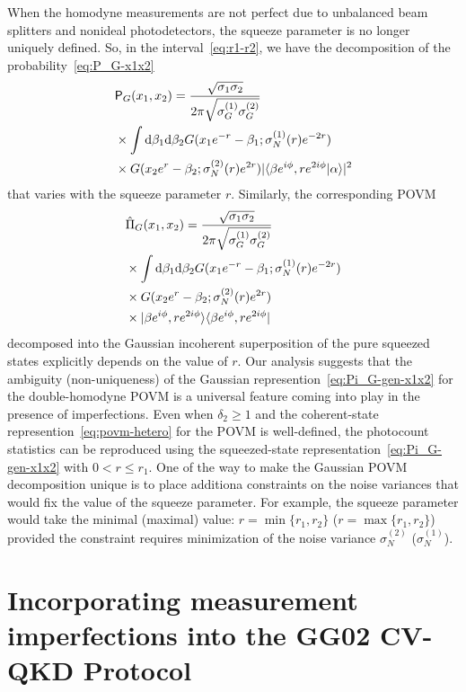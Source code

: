 \documentclass[%
reprint,
superscriptaddress,
 amsmath,amssymb,amsfonts,
 aps,
 pra,
 longbibliography
]{revtex4-2}
\newcommand{\ket}[1]{\ensuremath{|{#1}\rangle}}
\newcommand{\bra}[1]{\ensuremath{\langle{#1}|}}
\newcommand{\avr}[1]{\ensuremath{\langle{#1}\rangle}}
\newcommand{\prob}{\mathsf{P}}
\newcommand{\dd}{\mathrm{d}}
\begin{document}
When the homodyne measurements are not
perfect due to unbalanced beam splitters and nonideal photodetectors,
the squeeze parameter is no longer uniquely defined.
So, in the interval~\eqref{eq:r1-r2},
we have the decomposition of
the probability~\eqref{eq:P_G-x1x2}
\begin{align}
  \label{eq:P_G-gen-x1x2-2}
  &
    \prob_G(x_1,x_2)=\frac{\sqrt{\sigma_1\sigma_2}}{2\pi\sqrt{\sigma_G^{(1)}\sigma_G^{(2)}}}
\notag
  \\
  &
    \times
    \int \dd \beta_1\dd \beta_2
    G(x_1e^{-r}-\beta_1;\sigma_N^{(1)}(r)e^{-2r})
    \notag
  \\
  &
    \times
    G(x_2e^{r}-\beta_2;\sigma_N^{(2)}(r)e^{2r})
    |\avr{\beta e^{i\phi},r e^{2i\phi}|\alpha}|^2 
\end{align}
that varies with the squeeze parameter $r$.
Similarly,
the corresponding POVM 
\begin{align}
  \label{eq:Pi_G-gen-x1x2}
  &
    \hat{\Pi}_G(x_1,x_2)=\frac{\sqrt{\sigma_1\sigma_2}}{2\pi\sqrt{\sigma_G^{(1)}\sigma_G^{(2)}}}
\notag
  \\
  &
    \times
    \int \dd \beta_1\dd \beta_2
    G(x_1e^{-r}-\beta_1;\sigma_N^{(1)}(r)e^{-2r})
    \notag
  \\
  &
    \times
    G(x_2e^{r}-\beta_2;\sigma_N^{(2)}(r)e^{2r})
    \notag
  \\
  &
    \times
    \ket{\beta e^{i\phi},r e^{2i\phi}}\bra{\beta e^{i\phi},r e^{2i\phi}}
\end{align}
decomposed into
the Gaussian incoherent superposition
of the pure squeezed states explicitly depends on the value of $r$.
Our analysis suggests that  the ambiguity (non-uniqueness) of
the Gaussian represention~\eqref{eq:Pi_G-gen-x1x2} for the double-homodyne
POVM is a universal feature coming into play
in the presence of imperfections.
Even when $\delta_2\ge 1$ and
the coherent-state represention~\eqref{eq:povm-hetero} for the POVM is well-defined,
the photocount statistics can be reproduced using
the squeezed-state representation~\eqref{eq:Pi_G-gen-x1x2}
with $0<r \le r_1$.
One of the way to make the Gaussian POVM decomposition unique
is to place additiona constraints
on the noise variances that would fix the value of the squeeze parameter.
For example,
the squeeze parameter would take the minimal (maximal) value:
$r=\min\{r_1,r_2\}$ ($r=\max\{r_1,r_2\}$)
provided the constraint requires minimization of
the noise variance $\sigma_N^{(2)}$ ($\sigma_N^{(1)}$).
\section{Incorporating measurement imperfections into the GG02 CV-QKD Protocol}
\label{sec:protocol}
\end{document}
